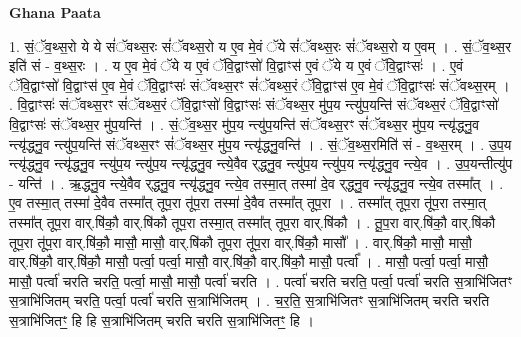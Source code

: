 \documentclass[17pt]{extarticle}
\begin{document}
\textbf{Ghana Paata } \newline

1. सं॒ॅव॒थ्स॒रो ये ये सं॑ॅवथ्स॒रः सं॑ॅवथ्स॒रो य ए॒व मे॒वं ॅये सं॑ॅवथ्स॒रः सं॑ॅवथ्स॒रो य ए॒वम् । . सं॒ॅव॒थ्स॒र इति॑ सं - व॒थ्स॒रः । . य ए॒व मे॒वं ॅये य ए॒वं ॅवि॒द्वाꣳसो॑ वि॒द्वाꣳस॑ ए॒वं ॅये य ए॒वं ॅवि॒द्वाꣳसः॑ । . ए॒वं ॅवि॒द्वाꣳसो॑ वि॒द्वाꣳस॑ ए॒व मे॒वं ॅवि॒द्वाꣳसः॑ संॅवथ्स॒रꣳ सं॑ॅवथ्स॒रं ॅवि॒द्वाꣳस॑ ए॒व मे॒वं ॅवि॒द्वाꣳसः॑ संॅवथ्स॒रम् । . वि॒द्वाꣳसः॑ संॅवथ्स॒रꣳ सं॑ॅवथ्स॒रं ॅवि॒द्वाꣳसो॑ वि॒द्वाꣳसः॑ संॅवथ्स॒र मु॑प॒य न्त्यु॑प॒यन्ति॑ संॅवथ्स॒रं ॅवि॒द्वाꣳसो॑ वि॒द्वाꣳसः॑ संॅवथ्स॒र मु॑प॒यन्ति॑ । . सं॒ॅव॒थ्स॒र मु॑प॒य न्त्यु॑प॒यन्ति॑ संॅवथ्स॒रꣳ सं॑ॅवथ्स॒र मु॑प॒य न्त्यृ॑द्ध्नु॒व
न्त्यृ॑द्ध्नु॒व न्त्यु॑प॒यन्ति॑ संॅवथ्स॒रꣳ सं॑ॅवथ्स॒र मु॑प॒य न्त्यृ॑द्ध्नु॒वन्ति॑ । . सं॒ॅव॒थ्स॒रमिति॑ सं - व॒थ्स॒रम् । . उ॒प॒य न्त्यृ॑द्ध्नु॒व न्त्यृ॑द्ध्नु॒व न्त्यु॑प॒य न्त्यु॑प॒य न्त्यृ॑द्ध्नु॒व न्त्ये॒वैव र्‌द्ध्नु॒व न्त्यु॑प॒य न्त्यु॑प॒य न्त्यृ॑द्ध्नु॒व न्त्ये॒व । . उ॒प॒यन्तीत्यु॑प - यन्ति॑ । . ऋ॒द्ध्नु॒व न्त्ये॒वैव र्‌द्ध्नु॒व न्त्यृ॑द्ध्नु॒व न्त्ये॒व तस्मा॒त् तस्मा॑ दे॒व र्‌द्ध्नु॒व न्त्यृ॑द्ध्नु॒व न्त्ये॒व तस्मा᳚त् । . ए॒व तस्मा॒त् तस्मा॑ दे॒वैव तस्मा᳚त् तूप॒रा तू॑प॒रा तस्मा॑ दे॒वैव तस्मा᳚त् तूप॒रा । . तस्मा᳚त् तूप॒रा तू॑प॒रा तस्मा॒त् तस्मा᳚त् तूप॒रा वार्.षि॑कौ॒ वार्.षि॑कौ तूप॒रा तस्मा॒त् तस्मा᳚त् तूप॒रा वार्.षि॑कौ । . तू॒प॒रा वार्.षि॑कौ॒ वार्.षि॑कौ तूप॒रा तू॑प॒रा वार्.षि॑कौ॒ मासौ॒ मासौ॒ वार्.षि॑कौ तूप॒रा तू॑प॒रा वार्.षि॑कौ॒ मासौ᳚ । . वार्.षि॑कौ॒ मासौ॒ मासौ॒ वार्.षि॑कौ॒ वार्.षि॑कौ॒ मासौ॒ पर्त्वा॒ पर्त्वा॒ मासौ॒ वार्.षि॑कौ॒ वार्.षि॑कौ॒ मासौ॒ पर्त्वा᳚ । . मासौ॒ पर्त्वा॒ पर्त्वा॒ मासौ॒ मासौ॒ पर्त्वा॑ चरति चरति॒ पर्त्वा॒ मासौ॒ मासौ॒ पर्त्वा॑ चरति । . पर्त्वा॑ चरति चरति॒ पर्त्वा॒ पर्त्वा॑ चरति स॒त्राभि॑जितꣳ स॒त्राभि॑जितम् चरति॒ पर्त्वा॒ पर्त्वा॑ चरति स॒त्राभि॑जितम् । . च॒र॒ति॒ स॒त्राभि॑जितꣳ स॒त्राभि॑जितम् चरति चरति स॒त्राभि॑जितꣳ॒॒ हि हि स॒त्राभि॑जितम् चरति चरति स॒त्राभि॑जितꣳ॒॒ हि । \newline
\end{document}
